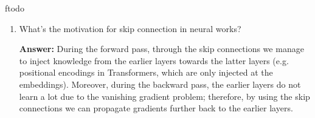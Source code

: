 ƒtodo\documentclass{article}
\newenvironment{QandA}{\begin{enumerate}[label=\arabic*.]}{\end{enumerate}}
\newenvironment{InnerQandA}{\begin{enumerate}[label=\roman*.]}{\end{enumerate}}
\newenvironment{answer}{\par\normalfont \textbf{Answer:}}{}
\newcommand{\R}{\mathbb{R}}
\begin{document}
\begin{QandA}
\begin{InnerQandA}
        \item Is ReLU differentiable? What to do when it’s not differentiable?
        \begin{answer}
            While ReLU is not differentiable at 0, we can use a faux gradient as follows:
            \begin{align*}
                \frac{\partial}{\partial x} \text{ReLU}(x) = \begin{cases}
                    x &\text{if } x \ge 0 \\
                    0 &\text{otherwise}
                \end{cases}
            \end{align*}
        \end{answer}

        \item Derive derivatives for sigmoid function $\sigma(x)$  when $x$ is a vector.
        \begin{answer}
            Previously, for $x \in \R$ we proved that:
            \begin{align*}
                \frac{\partial }{\partial x} \sigma(x) = \sigma(x)(1-\sigma(x))
            \end{align*}
            Since the activation function is applied element-wise, then the derivative when $x$ is a vector generalizes to a Hadamard product:
            \begin{align*}
                \frac{\partial }{\partial x} \sigma(x) = \sigma(x) \otimes (1-\sigma(x))
            \end{align*}
        \end{answer}
    \end{InnerQandA}

    \item What’s the motivation for skip connection in neural works?
    \begin{answer}
        During the forward pass, through the skip connections we manage to inject knowledge from the earlier layers towards the latter layers (e.g. positional encodings in Transformers, which are only injected at the embeddings). Moreover, during the backward pass, the earlier layers do not learn a lot due to the vanishing gradient problem; therefore, by using the skip connections we can propagate gradients further back to the earlier layers.
    \end{answer}


\end{QandA}
\end{document}
